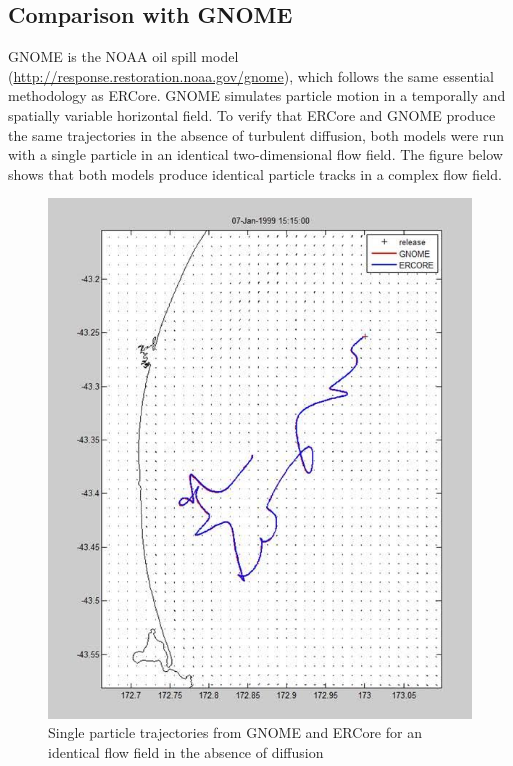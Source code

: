 \documentclass[a4paper]{article}
\begin{document}
\subsection{Comparison with GNOME}
GNOME is the NOAA oil spill model (\url{http://response.restoration.noaa.gov/gnome}), which follows the same essential methodology as ERCore.
GNOME simulates particle motion in a temporally and spatially variable horizontal field.
To verify that ERCore and GNOME produce the same trajectories in the absence of turbulent diffusion, both models were run with a single particle in an identical two-dimensional flow field.
The figure below shows that both models produce identical particle tracks in a complex flow field.
\begin{figure}
\includegraphics[width=\textwidth]{ercoregnome.png}
\caption{Single particle trajectories from GNOME and ERCore for an identical flow field in the absence of diffusion}
\end{figure}
\end{document}
